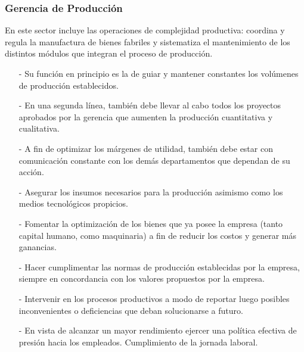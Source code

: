 \documentclass[a4paper,10pt,titlepage]{article}
\begin{document}

\newpage

\subsubsection{Gerencia de Producci\'on}
\smallskip
En este sector incluye las operaciones de complejidad productiva: coordina y regula la manufactura de bienes fabriles y sistematiza el mantenimiento de los distintos módulos que integran el proceso de producción.

{


}
{
\begin{itemize}
	\item[-] Su función en principio es la de guiar y mantener constantes los volúmenes de producción establecidos. 
	\item[-] En una segunda línea, también debe llevar al cabo todos los proyectos aprobados por la gerencia que aumenten la producción cuantitativa y cualitativa.  
	\item[-]A fin de optimizar los márgenes de utilidad, también debe estar con comunicación constante con los demás departamentos que dependan de su acción. 
	
\end{itemize}
}
{
\begin{itemize}
   \item[-] Asegurar los insumos necesarios para la producción asimismo como los medios tecnológicos propicios. 
   \item[-] Fomentar la optimización de los bienes que ya posee la empresa (tanto capital humano, como maquinaria) a fin de reducir los costos y generar más ganancias. 
   
\end{itemize}	
}
{
\begin{itemize}

   \item[-] Hacer cumplimentar las normas de producción establecidas por la empresa, siempre en concordancia con los valores propuestos por la empresa. 
   \item[-] Intervenir en los procesos productivos a modo de reportar luego posibles inconvenientes o deficiencias que deban solucionarse a futuro. 
   \item[-] En vista de alcanzar un mayor rendimiento ejercer una política efectiva de presión hacia los empleados. Cumplimiento de la jornada laboral. 

\end{itemize}
}
\end{document}
